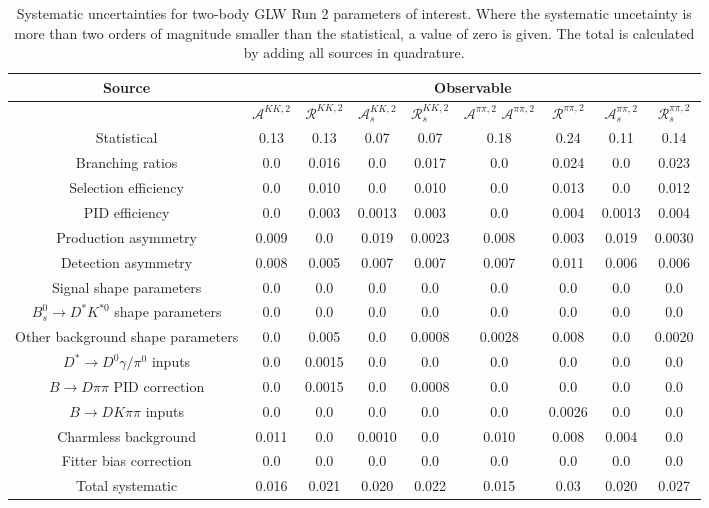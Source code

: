 \begin{sidewaystable}
  \centering
  \begin{tabular}{ccccccccc}
      \toprule
      Source & \multicolumn{8}{c}{Observable} \\
      \midrule
       & $\mathcal{A}^{KK,2}$ & $\mathcal{R}^{KK,2}$ & $\mathcal{A}_s^{KK,2}$ & $\mathcal{R}_{s}^{KK,2}$ & $\mathcal{A}^{\pi\pi,2}$
$\mathcal{A}^{\pi\pi,2}$ & $\mathcal{R}^{\pi\pi,2}$ & $\mathcal{A}_s^{\pi\pi,2}$ & $\mathcal{R}_{s}^{\pi\pi,2}$ \\
      \midrule
      Statistical & 0.13 & 0.13 & 0.07 & 0.07 & 0.18 & 0.24 & 0.11 & 0.14 \\
      \midrule
      Branching ratios & 0.0  & 0.016 & 0.0  & 0.017 & 0.0  & 0.024 & 0.0  & 0.023 \\
      Selection efficiency & 0.0  & 0.010 & 0.0  & 0.010 & 0.0  & 0.013 & 0.0  & 0.012 \\
      PID efficiency & 0.0  & 0.003 & 0.0013 & 0.003 & 0.0  & 0.004 & 0.0013 & 0.004 \\
      Production asymmetry & 0.009 & 0.0  & 0.019 & 0.0023 & 0.008 & 0.003 & 0.019 & 0.0030 \\
      Detection asymmetry & 0.008 & 0.005 & 0.007 & 0.007 & 0.007 & 0.011 & 0.006 & 0.006 \\
      Signal shape parameters & 0.0  & 0.0  & 0.0  & 0.0  & 0.0  & 0.0  & 0.0  & 0.0  \\
      $B^0_s \to D^* K^{*0}$ shape parameters & 0.0  & 0.0  & 0.0  & 0.0  & 0.0  & 0.0  & 0.0  & 0.0  \\
      Other background shape parameters & 0.0  & 0.005 & 0.0  & 0.0008 & 0.0028 & 0.008 & 0.0  & 0.0020 \\
      $D^* \to D^0 \gamma/\pi^0$ inputs & 0.0  & 0.0015 & 0.0  & 0.0  & 0.0  & 0.0  & 0.0  & 0.0  \\
      $B\to D\pi\pi$ PID correction & 0.0  & 0.0015 & 0.0  & 0.0008 & 0.0  & 0.0  & 0.0  & 0.0  \\
      $B\to DK\pi\pi$ inputs & 0.0  & 0.0  & 0.0  & 0.0  & 0.0  & 0.0026 & 0.0  & 0.0  \\
      Charmless background & 0.011 & 0.0  & 0.0010 & 0.0  & 0.010 & 0.008 & 0.004 & 0.0  \\
      Fitter bias correction & 0.0  & 0.0  & 0.0  & 0.0  & 0.0  & 0.0  & 0.0  & 0.0  \\
      \midrule
      Total systematic & 0.016 & 0.021 & 0.020 & 0.022 & 0.015 & 0.03 & 0.020 & 0.027 \\
      \bottomrule
  \end{tabular}
  \caption{Systematic uncertainties for two-body GLW Run 2 parameters of interest. Where the systematic uncetainty is more than two orders of magnitude smaller than the statistical, a value of zero is given. The total is calculated by adding all sources in quadrature.}
\label{tab:twoBody_GLW_run2_systematics}
\end{sidewaystable}
